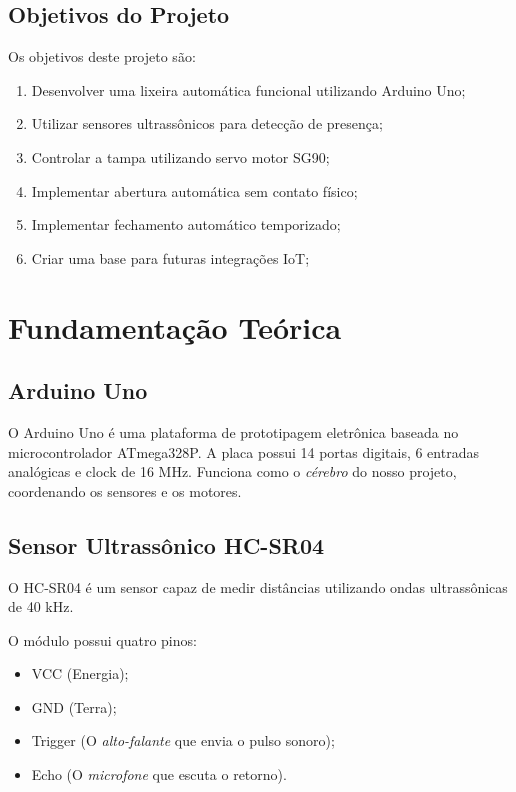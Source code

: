 \documentclass[12pt, openany, oneside, a4paper, brazilian]{abntex2}
\begin{document}
\section{Objetivos do Projeto}

Os objetivos deste projeto são:

\begin{enumerate}
    \item Desenvolver uma lixeira automática funcional utilizando Arduino Uno;
    \item Utilizar sensores ultrassônicos para detecção de presença;
    \item Controlar a tampa utilizando servo motor SG90;
    \item Implementar abertura automática sem contato físico;
    \item Implementar fechamento automático temporizado;
    \item Criar uma base para futuras integrações IoT;
\end{enumerate}



\chapter{Fundamentação Teórica}

\section{Arduino Uno}

O Arduino Uno é uma plataforma de prototipagem eletrônica baseada no
microcontrolador ATmega328P. A placa possui 14 portas digitais,
6 entradas analógicas e clock de 16 MHz. Funciona como o \textit{cérebro} do nosso projeto, coordenando os sensores e os motores.

\section{Sensor Ultrassônico HC-SR04}

O HC-SR04 é um sensor capaz de medir distâncias utilizando ondas ultrassônicas de 40 kHz. 

O módulo possui quatro pinos:
\begin{itemize}
    \item VCC (Energia);
    \item GND (Terra);
    \item Trigger (O \textit{alto-falante} que envia o pulso sonoro);
    \item Echo (O \textit{microfone} que escuta o retorno).
\end{itemize}
\end{document}
